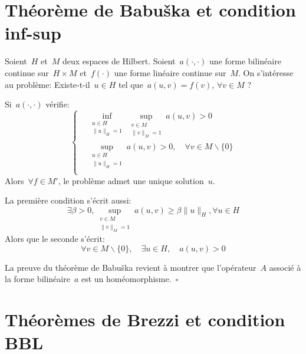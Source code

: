 \medskip\ifVersionDuDocEstVincent\else\newpage\fi
\section{Théorème de Babuška et condition inf-sup}\label{Sec-ThBabuska}

\begin{theoreme}
Soient~$H$ et~$M$ deux espaces de Hilbert.
Soient~$a(\cdot,\cdot)$ une forme bilinéaire continue sur~$H \times M$ et~$f(\cdot)$ une forme linéaire continue sur~$M$.
On s'intéresse au problème: Existe-t-il~$u\in H$ tel que~$a(u,v)=f(v)$, $\forall v\in M$ ?

Si~$a(\cdot,\cdot)$ vérifie:
\begin{equation}\left\{
\begin{aligned}
&\displaystyle\inf_{\substack{u\in H\\\|u\|_H=1}} \sup_{\substack{v\in M\\\|v\|_M=1}} a(u,v) > 0\\[+2mm]
&\displaystyle\sup_{\substack{u\in H\\\|u\|_H=1}} a(u,v) > 0, \quad\forall v\in M\backslash\{0\}\\
\end{aligned}\right.
\end{equation}
Alors~$\forall f\in M'$, le problème admet une unique solution~$u$.
\end{theoreme}

\medskip
La première condition s'écrit aussi:
\begin{equation}
\exists \beta > 0, \sup_{\substack{v\in M\\\|v\|_M=1}} a(u,v) \ge \beta \|u\|_H, \forall u\in H
\end{equation}
Alors que le seconde s'écrit:
\begin{equation}
\forall v\in M\backslash\{0\},\quad \exists u\in H,\quad a(u,v)>0
\end{equation}

\begin{demonstration}\footnotesize{}
La preuve du théorème de Babuška revient à montrer que l'opérateur~$A$ associé à la forme bilinéaire~$a$ est un homéomorphisme.~$\square$
\end{demonstration}

\medskip\ifVersionDuDocEstVincent\newpage\fi
\section{Théorèmes de Brezzi et condition BBL}\label{Sec-ThBrezzi}

